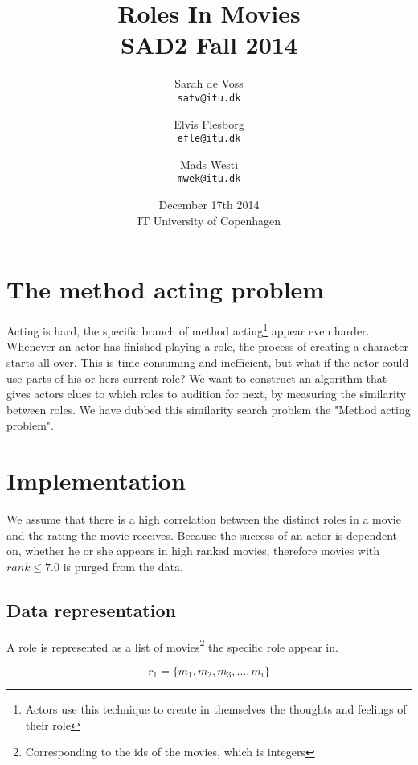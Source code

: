 \documentclass[a4paper,11pt]{article}
\begin{document}
\setlength{\parindent}{0cm}
\setlength{\unitlength}{1mm}
\date{December 17th 2014\\ IT University of Copenhagen}
\title{Roles In Movies\\SAD2 Fall 2014}

\author{Sarah de Voss\\
\texttt{satv@itu.dk}
\and Elvis Flesborg\\
\texttt{efle@itu.dk}
\and Mads Westi\\
\texttt{mwek@itu.dk}}
\clearpage\maketitle
\newpage
\thispagestyle{empty}
\setcounter{page}{1}
\tableofcontents
\newpage

\section{The method acting problem}
Acting is hard, the specific branch of method acting\footnote{Actors use this technique to create in themselves the thoughts and feelings of their role} appear even harder. Whenever an actor has finished playing a role, the process of creating a character starts all over. This is time consuming and inefficient, but what if the actor could use parts of his or hers current role? We want to construct an algorithm that gives actors clues to which roles to audition for next, by measuring the similarity between roles. We have dubbed this similarity search problem the "Method acting problem".


\section{Implementation}
We assume that there is a high correlation between the distinct roles in a movie and the rating the movie receives. Because the success of an actor is dependent on, whether he or she appears in high ranked movies, therefore movies with $rank \leq 7.0$ is purged from the data.


\subsection{Data representation}
A role is represented as a list of movies\footnote{Corresponding to the ids of the movies, which is integers} the specific role appear in.

\begin{equation}
r_1 = \{m_1, m_2, m_3, \ldots , m_i\}
\end{equation}
\end{document}
